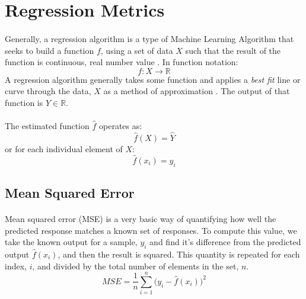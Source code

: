 \documentclass[12pt,letterpaper]{article}
\begin{document}

\section{Regression Metrics}
\paragraph*{}Generally, a regression algorithm is a type of Machine Learning Algorithm that seeks to build a function $f$, using a set of data $X$ such that the result of the function is continuous, real number value \cite{Petrik}. In function notation:
\begin{equation}
\label{regression function}
f: X \rightarrow \mathbb{R}
\end{equation}
A regression algorithm generally takes some function and applies a \textit{best fit} line or curve through the data, $X$ as a method of approximation \cite{Gareth}. The output of that function is $Y \in \mathbb{R}$. 
\paragraph*{}The estimated function $\hat{f}$  operates as:
\begin{equation}
\hat{f}(X) = \hat{Y}
\end{equation}
or for each individual element of $X$:
\begin{equation}
\hat{f}(x_i) = \hat{y}_i
\end{equation}


\subsection{Mean Squared Error}
\paragraph*{}Mean squared error (MSE) is a very basic way of quantifying how well the predicted response matches a known set of responses. To compute this value, we take the known output for a sample, $y_i$ and find it's difference from the predicted output $\hat{f}(x_i)$, and then the result is squared. This quantity is repeated for each index, $i$, and divided by the total number of elements in the set, $n$.
\begin{equation}
\label{MSE}
MSE = \frac{1}{n}\sum_{i=1}^{n} \Big( y_i - \hat{f}(x_i) \Big)^2
\end{equation}
\end{document}

